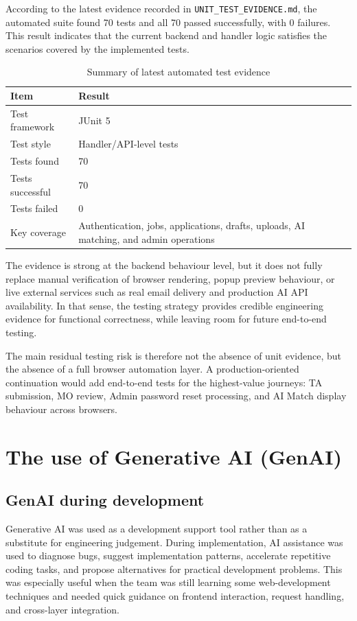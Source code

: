 \documentclass[11pt,a4paper]{article}
\begin{document}
According to the latest evidence recorded in \texttt{UNIT\_TEST\_EVIDENCE.md}, the automated suite found 70 tests and all 70 passed successfully, with 0 failures. This result indicates that the current backend and handler logic satisfies the scenarios covered by the implemented tests.

\begin{table}[htbp]
\centering
\small
\caption{Summary of latest automated test evidence}
\begin{tabularx}{0.82\textwidth}{M{0.35\textwidth} Y}
\toprule
\textbf{Item} & \textbf{Result} \\
\midrule
Test framework & JUnit 5 \\
Test style & Handler/API-level tests \\
Tests found & 70 \\
Tests successful & 70 \\
Tests failed & 0 \\
Key coverage & Authentication, jobs, applications, drafts, uploads, AI matching, and admin operations \\
\bottomrule
\end{tabularx}
\end{table}

The evidence is strong at the backend behaviour level, but it does not fully replace manual verification of browser rendering, popup preview behaviour, or live external services such as real email delivery and production AI API availability. In that sense, the testing strategy provides credible engineering evidence for functional correctness, while leaving room for future end-to-end testing.

The main residual testing risk is therefore not the absence of unit evidence, but the absence of a full browser automation layer. A production-oriented continuation would add end-to-end tests for the highest-value journeys: TA submission, MO review, Admin password reset processing, and AI Match display behaviour across browsers.

\section{The use of Generative AI (GenAI)}

\subsection{GenAI during development}

Generative AI was used as a development support tool rather than as a substitute for engineering judgement. During implementation, AI assistance was used to diagnose bugs, suggest implementation patterns, accelerate repetitive coding tasks, and propose alternatives for practical development problems. This was especially useful when the team was still learning some web-development techniques and needed quick guidance on frontend interaction, request handling, and cross-layer integration.
\end{document}
